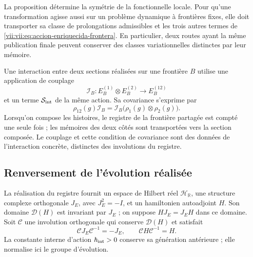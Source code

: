 La proposition détermine la symétrie de la fonctionnelle locale. Pour qu'une
transformation agisse aussi sur un problème dynamique à frontières fixes,
elle doit transporter sa classe de prolongations admissibles et les trois autres
termes de \eqref{vii:vii:eq:accion-enriquecida-frontera}. En particulier, deux
routes ayant la même publication finale peuvent conserver des classes
variationnelles distinctes par leur mémoire.

Une interaction entre deux sections réalisées sur une frontière \(B\)
utilise une application de couplage
\[
 \mathcal I_B:E_B^{(1)}\otimes E_B^{(2)}\longrightarrow E_B^{(12)}
\]
et un terme \(\mathcal S_{\rm int}\) de la même action. Sa covariance s'exprime par
\[
 \rho_{12}(g)\mathcal I_B
 =\mathcal I_B\bigl(\rho_1(g)\otimes\rho_2(g)\bigr).
\]
Lorsqu'on compose les histoires, le registre de la frontière partagée est compté
une seule fois ; les mémoires des deux côtés sont transportées vers la section composée.
Le couplage et cette condition de covariance sont des données de l'interaction
concrète, distinctes des involutions du registre.

\subsection{Renversement de l'évolution réalisée}
\label{vii:vii:subsec:reversion-evolucion}

La réalisation du registre fournit un espace de Hilbert réel \(\mathcal H_{\mathbb R}\), une structure complexe orthogonale \(J_E\), avec \(J_E^2=-I\), et un hamiltonien autoadjoint \(H\). Son domaine \(\mathcal D(H)\) est invariant par \(J_E\) ; on suppose \(HJ_E=J_EH\) dans ce domaine. Soit \(\mathcal C\) une involution orthogonale qui conserve \(\mathcal D(H)\) et satisfait
\begin{equation}
 \mathcal C J_E\mathcal C^{-1}=-J_E,\qquad
 \mathcal C H\mathcal C^{-1}=H.
 \label{vii:vii:eq:dominio-reversion-evolucion}
\end{equation}
La constante interne d'action \(\hbar_{\rm int}>0\) conserve sa
génération antérieure ; elle normalise ici le groupe d'évolution.

